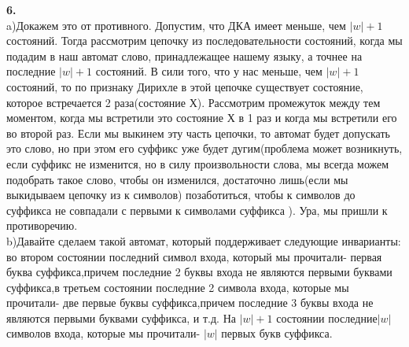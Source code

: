 \documentclass[a4paper,12pt]{article}
\begin{document}
\begin{center} 
\end{center}
\textbf{6.}\\
a)Докажем это от противного. Допустим, что ДКА имеет меньше, чем $|w|+1$ состояний. Тогда рассмотрим цепочку из последовательности состояний, когда мы подадим в наш автомат слово, принадлежащее нашему языку, а точнее на последние $|w|+1$ состояний. В сили того, что у нас меньше, чем $|w|+1$ состояний, то по признаку Дирихле в этой цепочке существует состояние, которое встречается 2 раза(состояние Х). Рассмотрим промежуток между тем моментом, когда мы встретили это состояние Х в 1 раз и когда мы встретили его во второй раз. Если мы выкинем эту часть цепочки, то автомат будет допускать это слово, но при этом его суффикс уже будет дугим(проблема может возникнуть, если суффикс не изменится, но в силу произвольности слова, мы всегда можем подобрать такое слово, чтобы он изменился, достаточно лишь(если мы выкидываем цепочку из к символов) позаботиться, чтобы к символов до суффикса не совпадали с первыми к символами суффикса ). Ура, мы пришли к противоречию.\\
b)Давайте сделаем такой автомат, который поддерживает следующие инварианты: во втором состоянии последний символ входа, который мы прочитали- первая буква суффикса,причем последние 2 буквы входа не являются первыми буквами суффикса,в третьем состоянии последние 2 символа входа, которые мы прочитали- две первые буквы суффикса,причем последние 3 буквы входа не являются первыми буквами суффикса, и т.д. На $|w|+1$ состоянии последние$|w|$ символов входа, которые мы прочитали- $|w|$ первых букв суффикса.\\
\end{document}
